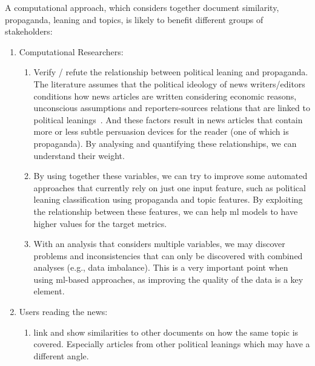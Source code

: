 A computational approach, which considers together document similarity, propaganda, leaning and topics, is likely to benefit different groups of stakeholders:

\begin{enumerate}
    \item Computational Researchers:
    \begin{enumerate}
        \item Verify / refute the relationship between political leaning and propaganda. The literature assumes that the political ideology of news writers/editors conditions how news articles are written considering economic reasons, unconscious  assumptions and reporters-sources relations that are linked to political leanings~\citep{schudson2002news}. And these factors result in news articles that contain more or less subtle persuasion devices for the reader (one of which is propaganda). By analysing and quantifying these relationships, we can understand their weight. %
        \item By using together these variables, we can try to improve some automated approaches that currently rely on just one input feature, such as political leaning classification using propaganda and topic features. By exploiting the relationship between these features, we can help \acrfull{ml} models to have higher values for the target metrics. %
        \item With an analysis that considers multiple variables, we may discover problems and inconsistencies that can only be discovered with combined analyses (e.g., data imbalance). This is a very important point when using \acrshort{ml}-based approaches, as improving the quality of the data is a key element. %
    \end{enumerate}
    \item Users reading the news:
    \begin{enumerate}
        \item link and show similarities to other documents on how the same topic is covered. Especially articles from other political leanings which may have a different angle.

\end{enumerate}
\end{enumerate}
